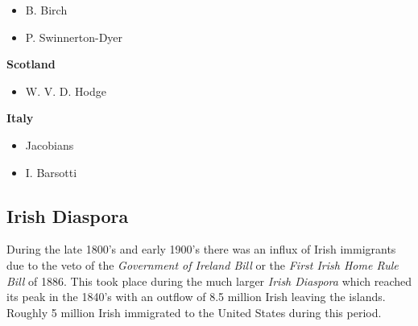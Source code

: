\begin{description}
\begin{itemize}\itemsep1pt
\item B. Birch
\item P. Swinnerton-Dyer
\end{itemize}
\item \textbf{Scotland}
\begin{itemize}\itemsep1pt
\item W. V. D. Hodge
\end{itemize}
\item \textbf{Italy}
\begin{itemize}\itemsep1pt
\item Jacobians
\item I. Barsotti
\end{itemize}
\end{description}


\subsection*{Irish Diaspora}

During the late 1800's and early 1900's there was an influx of Irish immigrants due to the veto of the \emph{Government of Ireland Bill} or the \emph{First Irish Home Rule Bill} of 1886. This took place during the much larger \emph{Irish Diaspora} which reached its peak in the 1840's with an outflow of 8.5 million Irish leaving the islands. Roughly 5 million Irish immigrated to the United States during this period\cite{Gal2000}.  

